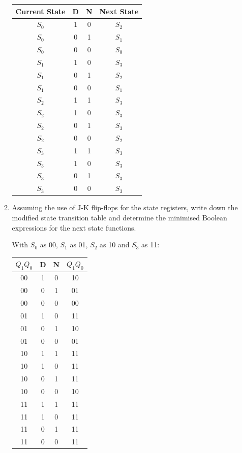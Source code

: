 \documentclass[10pt,\jkfside,a4paper]{article}
\begin{document}
\begin{enumerate}
\begin{enumerate}
\begin{center}
\begin{tabular}{|c|c|c|c|}
\hline
Current State & D & N & Next State\\
\hline
$S_0$ & 1 & 0 & $S_2$\\
$S_0$ & 0 & 1 & $S_1$\\
$S_0$ & 0 & 0 & $S_0$\\
$S_1$ & 1 & 0 & $S_3$\\
$S_1$ & 0 & 1 & $S_2$\\
$S_1$ & 0 & 0 & $S_1$\\
$S_2$ & 1 & 1 & $S_3$\\
$S_2$ & 1 & 0 & $S_3$\\
$S_2$ & 0 & 1 & $S_3$\\
$S_2$ & 0 & 0 & $S_2$\\
$S_3$ & 1 & 1 & $S_3$\\
$S_3$ & 1 & 0 & $S_3$\\
$S_3$ & 0 & 1 & $S_3$\\
$S_3$ & 0 & 0 & $S_3$\\
\hline
\end{tabular}
\end{center}

\item{Assuming the use of J-K flip-flops for the state registers, write down the modified state 
transition table and determine the minimised Boolean expressions for the next state functions.}

With $S_0$ as 00, $S_1$ as 01, $S_2$ as 10 and $S_3$ as 11:

\begin{center}
\begin{tabular}{|c|c|c|c|}
\hline
$Q_1Q_0$ & D & N & $Q_1Q_0$\\
\hline
00 & 1 & 0 & 10\\
00 & 0 & 1 & 01\\
00 & 0 & 0 & 00\\
01 & 1 & 0 & 11\\
01 & 0 & 1 & 10\\
01 & 0 & 0 & 01\\
10 & 1 & 1 & 11\\
10 & 1 & 0 & 11\\
10 & 0 & 1 & 11\\
10 & 0 & 0 & 10\\
11 & 1 & 1 & 11\\
11 & 1 & 0 & 11\\
11 & 0 & 1 & 11\\
11 & 0 & 0 & 11\\
\hline
\end{tabular}
\end{center}


\end{enumerate}
\end{enumerate}
\end{document}

